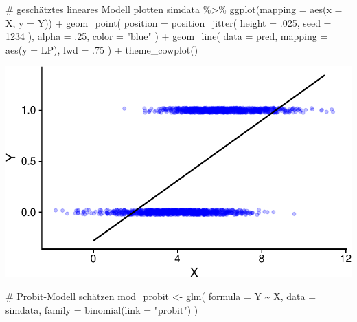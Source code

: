 \documentclass[
  a4paper,
  DIV=11,
  oneside]{scrreprt}
\newenvironment{Shaded}{\begin{snugshade}}{\end{snugshade}}
\newcommand{\AttributeTok}[1]{\textcolor[rgb]{0.40,0.45,0.13}{#1}}
\newcommand{\CommentTok}[1]{\textcolor[rgb]{0.37,0.37,0.37}{#1}}
\newcommand{\DecValTok}[1]{\textcolor[rgb]{0.68,0.00,0.00}{#1}}
\newcommand{\FunctionTok}[1]{\textcolor[rgb]{0.28,0.35,0.67}{#1}}
\newcommand{\NormalTok}[1]{\textcolor[rgb]{0.00,0.23,0.31}{#1}}
\newcommand{\OtherTok}[1]{\textcolor[rgb]{0.00,0.23,0.31}{#1}}
\newcommand{\SpecialCharTok}[1]{\textcolor[rgb]{0.37,0.37,0.37}{#1}}
\newcommand{\StringTok}[1]{\textcolor[rgb]{0.13,0.47,0.30}{#1}}
\begin{document}
\begin{Shaded}
\begin{Highlighting}[]
\CommentTok{\# geschätztes lineares Modell plotten}
\NormalTok{simdata }\SpecialCharTok{\%\textgreater{}\%}
  \FunctionTok{ggplot}\NormalTok{(}\AttributeTok{mapping =} \FunctionTok{aes}\NormalTok{(}\AttributeTok{x =}\NormalTok{ X, }\AttributeTok{y =}\NormalTok{ Y)) }\SpecialCharTok{+}
  \FunctionTok{geom\_point}\NormalTok{(}
    \AttributeTok{position =} \FunctionTok{position\_jitter}\NormalTok{(}
      \AttributeTok{height =}\NormalTok{ .}\DecValTok{025}\NormalTok{,}
      \AttributeTok{seed =} \DecValTok{1234}
\NormalTok{    ),}
    \AttributeTok{alpha =}\NormalTok{ .}\DecValTok{25}\NormalTok{,}
    \AttributeTok{color =} \StringTok{"blue"}
\NormalTok{  ) }\SpecialCharTok{+}
  \FunctionTok{geom\_line}\NormalTok{(}
    \AttributeTok{data =}\NormalTok{ pred, }
    \AttributeTok{mapping =} \FunctionTok{aes}\NormalTok{(}\AttributeTok{y =}\NormalTok{ LP),}
    \AttributeTok{lwd =}\NormalTok{ .}\DecValTok{75}
\NormalTok{  ) }\SpecialCharTok{+}
  \FunctionTok{theme\_cowplot}\NormalTok{()}
\end{Highlighting}
\end{Shaded}

\includegraphics{Reg_files/figure-pdf/unnamed-chunk-6-1.pdf}

\begin{Shaded}
\begin{Highlighting}[]
\CommentTok{\# Probit{-}Modell schätzen}
\NormalTok{mod\_probit }\OtherTok{\textless{}{-}} \FunctionTok{glm}\NormalTok{(}
  \AttributeTok{formula =}\NormalTok{ Y }\SpecialCharTok{\textasciitilde{}}\NormalTok{ X,}
  \AttributeTok{data =}\NormalTok{ simdata, }
  \AttributeTok{family =} \FunctionTok{binomial}\NormalTok{(}\AttributeTok{link =} \StringTok{"probit"}\NormalTok{)}
\NormalTok{)}
\end{Highlighting}
\end{Shaded}
\end{document}
